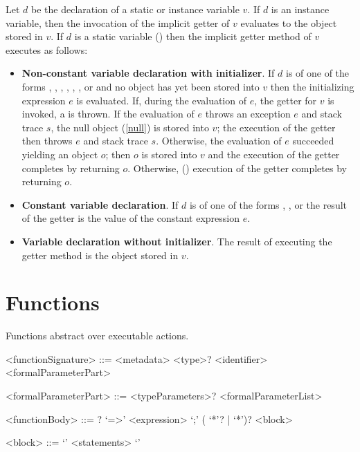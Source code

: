 \documentclass[makeidx]{article}
\begin{document}
\LMHash{}%
Let $d$ be the declaration of a static or instance variable $v$.
If $d$ is an instance variable,
then the invocation of the implicit getter of $v$ evaluates to
the object stored in $v$.
If $d$ is a static variable
()
then the implicit getter method of $v$ executes as follows:
\begin{itemize}
\item {\bf Non-constant variable declaration with initializer}.
If $d$ is of one of the forms
,
,
,
,
,
,
 or
and no object has yet been stored into $v$
then the initializing expression $e$ is evaluated.
If, during the evaluation of $e$, the getter for $v$ is invoked,
a  is thrown.
If the evaluation of $e$ throws an exception $e$ and stack trace $s$,
the null object (\ref{null}) is stored into $v$;
the execution of the getter then throws $e$ and stack trace $s$.
Otherwise, the evaluation of $e$ succeeded yielding an object $o$;
then $o$ is stored into $v$ and
the execution of the getter completes by returning $o$.
Otherwise,
()
execution of the getter completes by returning $o$.
\item {\bf Constant variable declaration}.
If $d$ is of one of the forms
,
,
 or
the result of the getter is the value of the constant expression $e$.
\item {\bf Variable declaration without initializer}.
The result of executing the getter method is the object stored in $v$.
\end{itemize}


\section{Functions}

\LMHash{}%
Functions abstract over executable actions.

\begin{grammar}
<functionSignature> ::= \gnewline{}
  <metadata> <type>? <identifier> <formalParameterPart>

<formalParameterPart> ::= <typeParameters>? <formalParameterList>

<functionBody> ::= \ASYNC{}? `=>' <expression> `;'
  \alt (\ASYNC{} `*'? | \SYNC{} `*')? <block>

<block> ::= `{' <statements> `}'
\end{grammar}
\end{document}
